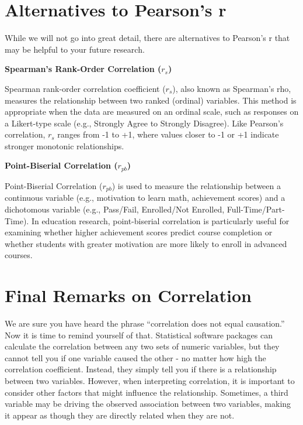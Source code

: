 \documentclass[
  letterpaper,
  DIV=11,
  numbers=noendperiod]{scrreprt}
\begin{document}
\section{Alternatives to Pearson's r}\label{alternatives-to-pearsons-r}

While we will not go into great detail, there are alternatives to
Pearson's r that may be helpful to your future research.

\textbf{Spearman's Rank-Order Correlation (\(r_s\))}

Spearman rank-order correlation coefficient (\(r_s\)), also known as
Spearman's rho, measures the relationship between two ranked (ordinal)
variables. This method is appropriate when the data are measured on an
ordinal scale, such as responses on a Likert-type scale (e.g., Strongly
Agree to Strongly Disagree). Like Pearson's correlation,
\hspace{0pt}\(r_s\) ranges from -1 to +1, where values closer to -1 or
+1 indicate stronger monotonic relationships.

\textbf{Point-Biserial Correlation (\(r_{pb}\))}

Point-Biserial Correlation (\(r_{pb}\)) is used to measure the
relationship between a continuous variable (e.g., motivation to learn
math, achievement scores) and a dichotomous variable (e.g., Pass/Fail,
Enrolled/Not Enrolled, Full-Time/Part-Time). In education research,
point-biserial correlation is particularly useful for examining whether
higher achievement scores predict course completion or whether students
with greater motivation are more likely to enroll in advanced courses.

\section{Final Remarks on
Correlation}\label{final-remarks-on-correlation}

We are sure you have heard the phrase ``correlation does not equal
causation.'' Now it is time to remind yourself of that. Statistical
software packages can calculate the correlation between any two sets of
numeric variables, but they cannot tell you if one variable caused the
other - no matter how high the correlation coefficient. Instead, they
simply tell you if there is a relationship between two variables.
However, when interpreting correlation, it is important to consider
other factors that might influence the relationship. Sometimes, a third
variable may be driving the observed association between two variables,
making it appear as though they are directly related when they are not.
\end{document}
